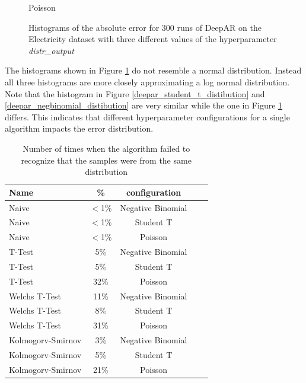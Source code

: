 \begin{figure}[htb]
  \caption{Poisson}
  \label{deepar_poisson_distribution}
  \endminipage
  \caption{Histograms of the absolute error for 300 runs of DeepAR on the Electricity dataset with three different values of the hyperparameter \emph{distr\_output}}
  \label{deepar_elec_300_hist}
\end{figure}


The histograms shown in Figure \ref{deepar_elec_300_hist} do not resemble a normal distribution. Instead all three histograms are more closely approximating a log normal distribution. Note that the histogram in Figure \ref{deepar_student_t_distibution} and \ref{deepar_negbinomial_distibution} are very similar while the one in Figure \ref{deepar_elec_300_hist} differs. This indicates that different hyperparameter configurations for a single algorithm impacts the error distribution.


\begin{table}[htp]
  \centering
  \begin{tabular}{lcccc}
    {\textbf Name}    & {\textbf \%} & {\textbf configuration} \\
    \hline
    Naive             & $<$1\%       & Negative Binomial       \\
    Naive             & $<$1\%       & Student T               \\
    Naive             & $<$1\%       & Poisson                 \\
    \hline
    T-Test            & 5\%          & Negative Binomial       \\
    T-Test            & 5\%          & Student T               \\
    T-Test            & 32\%         & Poisson                 \\
    \hline
    Welchs T-Test     & 11\%         & Negative Binomial       \\
    Welchs T-Test     & 8\%          & Student T               \\
    Welchs T-Test     & 31\%         & Poisson                 \\
    \hline
    Kolmogorv-Smirnov & 3\%          & Negative Binomial       \\
    Kolmogorv-Smirnov & 5\%          & Student T               \\
    Kolmogorv-Smirnov & 21\%         & Poisson                 \\
    \hline
  \end{tabular}
  \caption{Number of times when the algorithm failed to recognize that the samples were from the same distribution}
  \label{tab:false_rejects}
\end{table}

